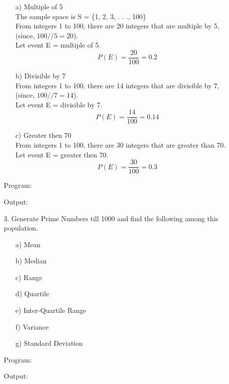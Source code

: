 \documentclass[a4paper,11pt,openright]{report}
\begin{document}
\begin{enumerate}
\begin{enumerate}

\item[a)] Multiple of 5 \\
The sample space is S = \{1, 2, 3, . . ., 100\} \\
From integers 1 to 100, there are 20 integers that are multiple by 5, 
(since, $100//5 = 20$). \\
Let event E = multiple of 5. 
\begin{equation*}
P(E) = \frac{20}{100} = 0.2
\end{equation*}

\item[b)] Divisible by 7 \\
From integers 1 to 100, there are 14 integers that are divisible by 7,
(since,  $100//7 = 14$). \\
Let event E = divisible by 7.
\begin{equation*}
P(E) = \frac{14}{100} = 0.14
\end{equation*}

\item[c)] Greater then 70 \\
From integers 1 to 100, there are 30 integers that are greater than 70. \\
Let event E = greater then 70. \\
\begin{equation*}
P(E) = \frac{30}{100} = 0.3
\end{equation*}
\end{enumerate}

\pagebreak

Program:


\pagebreak

Output:


\vspace{30px}

\pagebreak

\item[3.] Generate Prime Numbers till 1000 and find the following among this population.
\begin{enumerate}
\item[a)] Mean
\item[b)] Median
\item[c)] Range
\item[d)] Quartile
\item[e)] Inter-Quartile Range
\item[f)] Variance
\item[g)] Standard Deviation
\end{enumerate}

Program: 


\vspace{10px}

Output:


\end{enumerate}
\end{document}
